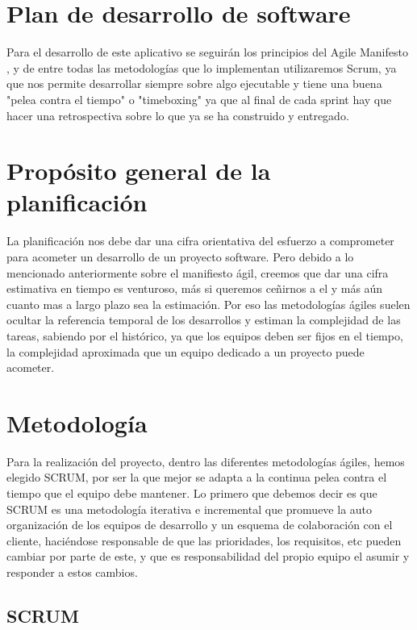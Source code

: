 \documentclass[../pfc.tex]{subfiles}
\begin{document}
	
	\section{Plan de desarrollo de software}
	
	Para el desarrollo de este aplicativo se seguirán los principios del Agile Manifesto \cite{agile}, y de entre todas las metodologías que lo implementan utilizaremos Scrum, ya que nos permite desarrollar siempre sobre algo ejecutable y tiene una buena "pelea contra el tiempo" o "timeboxing" ya que al final de cada sprint hay que hacer una retrospectiva sobre lo que ya se ha construido y entregado.

	\section{Propósito general de la planificación}
	
	La planificación nos debe dar una cifra orientativa del esfuerzo a comprometer para acometer un desarrollo de un proyecto software. Pero debido a lo mencionado anteriormente sobre el manifiesto ágil, creemos que dar una cifra estimativa en tiempo es venturoso, más si queremos ceñirnos a el y más aún cuanto mas a largo plazo sea la estimación. Por eso las metodologías ágiles suelen ocultar la referencia temporal de los desarrollos y estiman la complejidad de las tareas, sabiendo por el histórico, ya que los equipos deben ser fijos en el tiempo, la complejidad aproximada que un equipo dedicado a un proyecto puede acometer. 
	
	\section{Metodología }
	
	Para la realización del proyecto, dentro las diferentes metodologías ágiles, hemos elegido SCRUM, por ser la que mejor se adapta a la continua pelea contra el tiempo que el equipo debe mantener. 
	Lo primero que debemos decir es que SCRUM es una metodología iterativa e incremental que promueve la auto organización de los equipos de desarrollo y un esquema de colaboración con el cliente, haciéndose responsable de que las prioridades, los requisitos, etc pueden cambiar por parte de este, y que es responsabilidad del propio equipo el asumir y responder a estos cambios. 
	
	\subsection{SCRUM}
	
\end{document}
